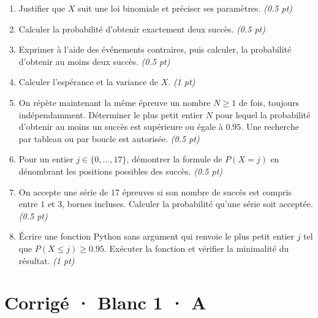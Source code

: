 \begin{enumerate}

\item Justifier que $X$ suit une loi binomiale et préciser ses paramètres. \hfill\textit{(\num{0,5} pt)}

\item Calculer la probabilité d'obtenir exactement deux succès. \hfill\textit{(\num{0,5} pt)}

\item Exprimer à l'aide des événements contraires, puis calculer, la probabilité d'obtenir au moins deux succès. \hfill\textit{(\num{0,5} pt)}

\item Calculer l'espérance et la variance de $X$. \hfill\textit{(1 pt)}

\item On répète maintenant la même épreuve un nombre $N\ge1$ de fois, toujours indépendamment. Déterminer le plus petit entier $N$ pour lequel la probabilité d'obtenir au moins un succès est supérieure ou égale à $\num{0,95}$. Une recherche par tableau ou par boucle est autorisée. \hfill\textit{(\num{0,5} pt)}

\item Pour un entier $j\in\{0,\ldots,17\}$, démontrer la formule de $P(X=j)$ en dénombrant les positions possibles des succès. \hfill\textit{(\num{0,5} pt)}

\item On accepte une série de $17$ épreuves si son nombre de succès est compris entre $1$ et $3$, bornes incluses. Calculer la probabilité qu'une série soit acceptée. \hfill\textit{(\num{0,5} pt)}

\item Écrire une fonction Python sans argument qui renvoie le plus petit entier $j$ tel que $P(X\le j)\ge\num{0,95}$. Exécuter la fonction et vérifier la minimalité du résultat. \hfill\textit{(1 pt)}

\end{enumerate}

\ifmxteacher\mxnewpage

\section*{Corrigé · Blanc 1 · A}\label{cor:5-3}

